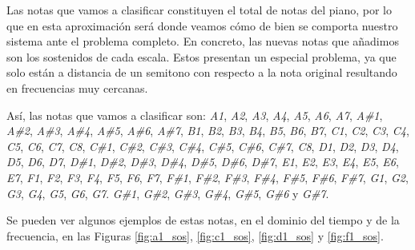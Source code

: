 \documentclass[12pt]{article}
\begin{document}
\bigskip
Las notas que vamos a clasificar constituyen el total de notas del
piano, por lo que en esta aproximación será donde veamos cómo de bien se comporta nuestro sistema ante el problema
completo.
En concreto, las nuevas notas que añadimos son los sostenidos de cada escala. Estos presentan un especial problema, ya que solo están a distancia de un semitono con
respecto a la nota original resultando en frecuencias muy cercanas.

\bigskip
Así, las notas que vamos a clasificar son: 
\textit{A1}, \textit{A2}, \textit{A3}, \textit{A4}, \textit{A5}, \textit{A6}, \textit{A7},
\textit{A\#1}, \textit{A\#2}, \textit{A\#3}, \textit{A\#4}, \textit{A\#5}, \textit{A\#6}, \textit{A\#7},
\textit{B1}, \textit{B2}, \textit{B3}, \textit{B4}, \textit{B5}, \textit{B6}, \textit{B7},
\textit{C1}, \textit{C2}, \textit{C3}, \textit{C4}, \textit{C5}, \textit{C6}, \textit{C7}, \textit{C8},
\textit{C\#1}, \textit{C\#2}, \textit{C\#3}, \textit{C\#4}, \textit{C\#5}, \textit{C\#6}, \textit{C\#7}, \textit{C8}, 
\textit{D1}, \textit{D2}, \textit{D3}, \textit{D4}, \textit{D5}, \textit{D6}, \textit{D7},
\textit{D\#1}, \textit{D\#2}, \textit{D\#3}, \textit{D\#4}, \textit{D\#5}, \textit{D\#6}, \textit{D\#7},
\textit{E1}, \textit{E2}, \textit{E3}, \textit{E4}, \textit{E5}, \textit{E6}, \textit{E7},
\textit{F1}, \textit{F2}, \textit{F3}, \textit{F4}, \textit{F5}, \textit{F6}, \textit{F7},
\textit{F\#1}, \textit{F\#2}, \textit{F\#3}, \textit{F\#4}, \textit{F\#5}, \textit{F\#6}, \textit{F\#7},
\textit{G1}, \textit{G2}, \textit{G3}, \textit{G4}, \textit{G5}, \textit{G6}, \textit{G7}.
\textit{G\#1}, \textit{G\#2}, \textit{G\#3}, \textit{G\#4}, \textit{G\#5}, \textit{G\#6} y \textit{G\#7}.

Se pueden ver algunos ejemplos de estas notas, en el dominio del tiempo y de la frecuencia, en las Figuras
\ref{fig:a1_sos}, \ref{fig:c1_sos}, \ref{fig:d1_sos} y \ref{fig:f1_sos}.
\end{document}
